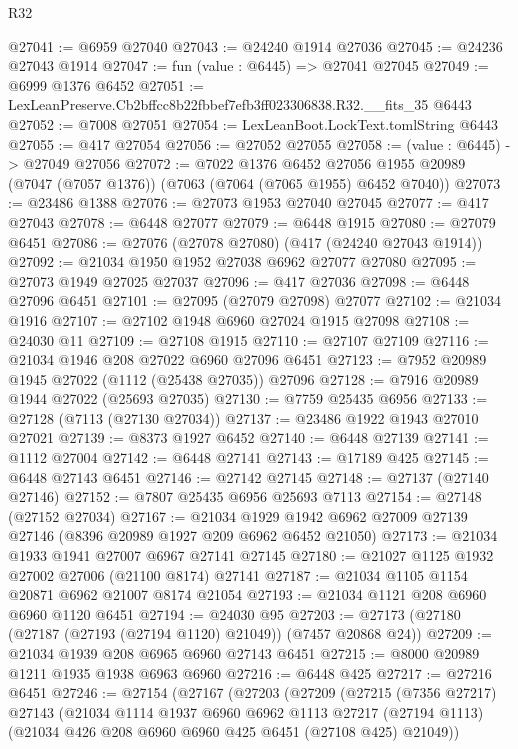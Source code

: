 \begin{lexlean}{R32}
\begin{coremodule}
@27041 := @6959 @27040
@27043 := @24240 @1914 @27036
@27045 := @24236 @27043 @1914
@27047 := fun (value : @6445) => @27041 @27045
@27049 := @6999 @1376 @6452
@27051 := LexLeanPreserve.Cb2bffcc8b22fbbef7efb3ff023306838.R32.__fits_35 @6443
@27052 := @7008 @27051
@27054 := LexLeanBoot.LockText.tomlString @6443
@27055 := @417 @27054
@27056 := @27052 @27055
@27058 := (value : @6445) -> @27049 @27056
@27072 := @7022
    @1376
    @6452
    @27056
    @1955
    @20989
    (@7047 (@7057 @1376))
    (@7063 (@7064 (@7065 @1955) @6452 @7040))
@27073 := @23486 @1388
@27076 := @27073 @1953 @27040 @27045
@27077 := @417 @27043
@27078 := @6448 @27077
@27079 := @6448 @1915
@27080 := @27079 @6451
@27086 := @27076 (@27078 @27080) (@417 (@24240 @27043 @1914))
@27092 := @21034 @1950 @1952 @27038 @6962 @27077 @27080
@27095 := @27073 @1949 @27025 @27037
@27096 := @417 @27036
@27098 := @6448 @27096 @6451
@27101 := @27095 (@27079 @27098) @27077
@27102 := @21034 @1916
@27107 := @27102 @1948 @6960 @27024 @1915 @27098
@27108 := @24030 @11
@27109 := @27108 @1915
@27110 := @27107 @27109
@27116 := @21034 @1946 @208 @27022 @6960 @27096 @6451
@27123 := @7952 @20989 @1945 @27022 (@1112 (@25438 @27035)) @27096
@27128 := @7916 @20989 @1944 @27022 (@25693 @27035)
@27130 := @7759 @25435 @6956
@27133 := @27128 (@7113 (@27130 @27034))
@27137 := @23486 @1922 @1943 @27010 @27021
@27139 := @8373 @1927 @6452
@27140 := @6448 @27139
@27141 := @1112 @27004
@27142 := @6448 @27141
@27143 := @17189 @425
@27145 := @6448 @27143 @6451
@27146 := @27142 @27145
@27148 := @27137 (@27140 @27146)
@27152 := @7807 @25435 @6956 @25693 @7113
@27154 := @27148 (@27152 @27034)
@27167 := @21034 @1929 @1942 @6962 @27009 @27139 @27146 (@8396 @20989 @1927 @209 @6962 @6452 @21050)
@27173 := @21034 @1933 @1941 @27007 @6967 @27141 @27145
@27180 := @21027 @1125 @1932 @27002 @27006 (@21100 @8174) @27141
@27187 := @21034 @1105 @1154 @20871 @6962 @21007 @8174 @21054
@27193 := @21034 @1121 @208 @6960 @6960 @1120 @6451
@27194 := @24030 @95
@27203 := @27173 (@27180 (@27187 (@27193 (@27194 @1120) @21049)) (@7457 @20868 @24))
@27209 := @21034 @1939 @208 @6965 @6960 @27143 @6451
@27215 := @8000 @20989 @1211 @1935 @1938 @6963 @6960
@27216 := @6448 @425
@27217 := @27216 @6451
@27246 := @27154
    (@27167
      (@27203
        (@27209
          (@27215
            (@7356 @27217)
            @27143
            (@21034
              @1114
              @1937
              @6960
              @6962
              @1113
              @27217
              (@27194 @1113)
              (@21034 @426 @208 @6960 @6960 @425 @6451 (@27108 @425) @21049))

\end{coremodule}
\end{lexlean}
